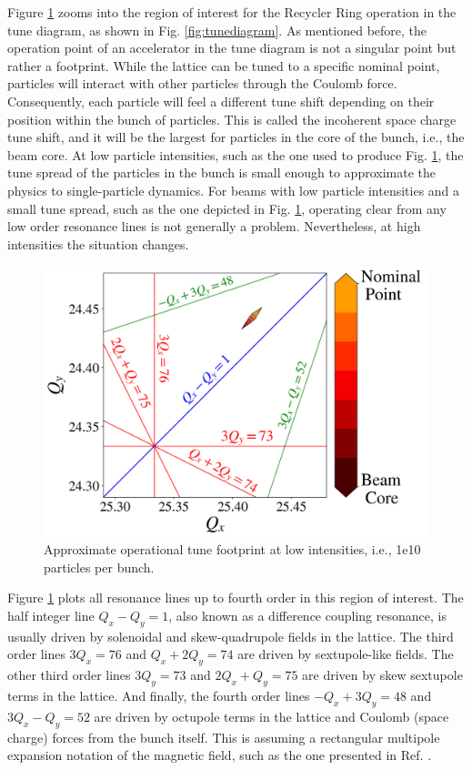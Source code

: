 Figure \ref{fig:rrtdlow} zooms into the region of interest for the Recycler Ring operation in the tune diagram, as shown in Fig. \ref{fig:tunediagram}. As mentioned before, the operation point of an accelerator in the tune diagram is not a singular point but rather a footprint. While the lattice can be tuned to a specific nominal point, particles will interact with other particles through the Coulomb force. Consequently, each particle will feel a different tune shift depending on their position within the bunch of particles. This is called the incoherent space charge tune shift, and it will be the largest for particles in the core of the bunch, i.e., the beam core. At low particle intensities, such as the one used to produce Fig. \ref{fig:rrtdlow}, the tune spread of the particles in the bunch is small enough to approximate the physics to single-particle dynamics. For beams with low particle intensities and a small tune spread, such as the one depicted in Fig. \ref{fig:rrtdlow}, operating clear from any low order resonance lines is not generally a problem. Nevertheless, at high intensities the situation changes.   

 \begin{figure}[H]
    \centering
    \includegraphics[width=\columnwidth]{chapter2/rrtdlow.png}
    \caption{Approximate operational tune footprint at low intensities, i.e., 1e10 particles per bunch.}
    \label{fig:rrtdlow}
 \end{figure}

Figure \ref{fig:rrtdlow} plots all resonance lines up to fourth order in this region of interest. The half integer line $Q_x-Q_y=1$, also known as a difference coupling resonance, is usually driven by solenoidal and skew-quadrupole fields in the lattice. The third order lines $3Q_x=76$ and $Q_x+2Q_y=74$ are driven by sextupole-like fields. The other third order lines $3Q_y=73$ and $2Q_x+Q_y=75$ are driven by skew sextupole terms in the lattice. And finally, the fourth order lines $-Q_x+3Q_y=48$ and $3Q_x-Q_y=52$ are driven by octupole terms in the lattice and Coulomb (space charge) forces from the bunch itself. This is assuming a rectangular multipole expansion notation of the magnetic field, such as the one presented in Ref. \cite{sylee}.      

